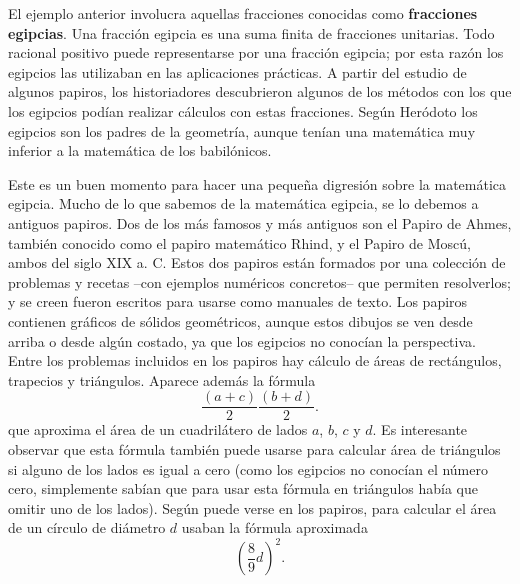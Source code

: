 El ejemplo anterior involucra aquellas fracciones conocidas como
\textbf{fracciones egipcias}. Una fracción egipcia es una suma finita de
fracciones unitarias.  Todo racional positivo puede representarse por una
fracción egipcia; por esta razón los egipcios las utilizaban en las
aplicaciones prácticas.  A partir del estudio de algunos papiros, los
historiadores descubrieron algunos de los métodos con los que los egipcios
podían realizar cálculos con estas fracciones. 
Según Heródoto los egipcios son los padres de la geometría, aunque tenían una
matemática muy inferior a la matemática de los babilónicos.  

Este es un buen momento para hacer una pequeña digresión sobre la matemática
egipcia. Mucho de lo que sabemos de la matemática egipcia, se lo debemos a
antiguos papiros. Dos de los más famosos y más antiguos son el Papiro de Ahmes,
también conocido como el papiro matemático Rhind, y el Papiro de Moscú, ambos
del siglo XIX a. C. Estos dos papiros están formados por una colección de
problemas y recetas --con ejemplos numéricos concretos-- que permiten
resolverlos; y se creen fueron escritos para usarse como manuales de texto. Los
papiros contienen gráficos de sólidos geométricos, aunque  estos dibujos se ven
desde arriba o desde algún costado, ya que los egipcios no conocían la
perspectiva.  Entre los problemas incluidos en los papiros hay cálculo de áreas
de rectángulos, trapecios y triángulos. Aparece además la fórmula 
\[
	\frac{(a+c)}{2}\frac{(b+d)}{2}.
\]
que aproxima el área de un cuadrilátero de lados $a$, $b$, $c$ y $d$.  Es
interesante observar que esta fórmula también puede usarse para calcular área
de triángulos si alguno de los lados es igual a cero (como los egipcios no
conocían el número cero, simplemente sabían que para usar esta fórmula en
triángulos había que omitir uno de los lados). Según puede verse en los
papiros, para calcular el área de un círculo de diámetro $d$ usaban la
fórmula aproximada 
\begin{equation}
	\label{eq:egipcio_circle}
	\left(\frac89d\right)^2.
\end{equation}

